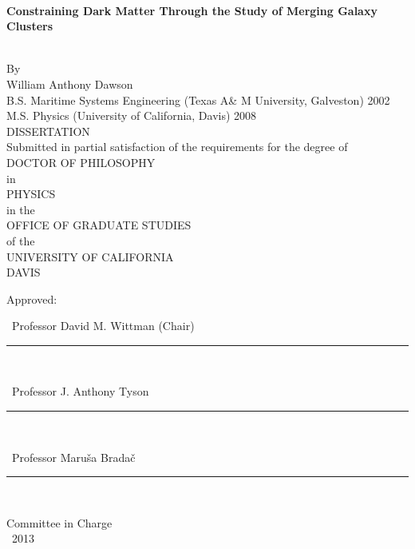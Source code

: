 \singlespacing

~\vspace{-0.75in} %
\begin{center}

  \begin{large}
    {\bf Constraining Dark Matter Through the Study of Merging Galaxy Clusters}
  \end{large}\\\n
  By\\\n
  {\sc William Anthony Dawson}\\
  B.S. Maritime Systems Engineering (Texas A\& M University, Galveston) 2002\\
  M.S. Physics (University of California, Davis) 2008\\\n
  DISSERTATION\\\n
  Submitted in partial satisfaction of the requirements for the degree of\\\n
  DOCTOR OF PHILOSOPHY\\\n
  in\\\n
  PHYSICS\\\n
  in the\\\n
  OFFICE OF GRADUATE STUDIES\\\n
  of the\\\n
  UNIVERSITY OF CALIFORNIA\\\n
  DAVIS\\\n\n
  
  Approved:\\\n\n
  
  ~Professor David M. Wittman (Chair)\\
  \rule{4in}{1pt}\\\n\n  

  ~Professor J. Anthony Tyson\\
  \rule{4in}{1pt}\\\n\n  

  ~Professor Maru{\v s}a Brada{\v c}\\
  \rule{4in}{1pt}\\

  \vfill
  
  Committee in Charge\\
  ~2013
  
\end{center}
